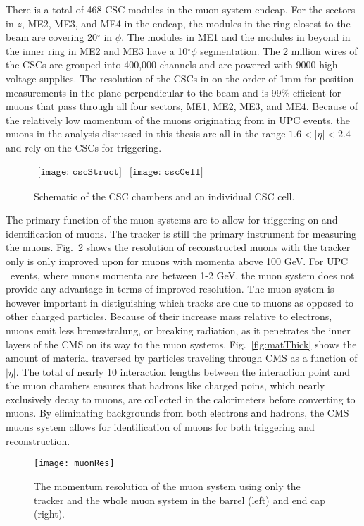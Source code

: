     There is a total of 468 CSC modules in the muon system endcap. 
    For the sectors in $z$, ME2, ME3, and ME4 in the endcap, the modules in 
      the ring closest to the beam are covering 20$^{\circ}$ in $\phi$.
    The modules in ME1 and the modules in beyond in the inner ring in
      ME2 and ME3 have a 10$^{\circ} \phi$ segmentation.
    The 2 million wires of the CSCs are grouped into 400,000 channels and are
      powered with 9000 high voltage supplies. 
    The resolution of the CSCs in on the order of 1mm for position measurements 
      in the plane perpendicular to the beam and is 99\% efficient for muons
      that pass through all four sectors, ME1, ME2, ME3, and ME4.
    Because of the relatively low momentum of the muons originating from \JPsi{}
      in UPC events, the muons in the analysis discussed in this thesis are all
      in the range $1.6 < |\eta| < 2.4$ and rely on the CSCs for triggering. 
    \begin{figure}[!Hhbt]
      \centering
      $ \begin{array}{cc}
        \texttt{[image: cscStruct]} &
        \texttt{[image: cscCell]}
      \end{array} $
      \caption{Schematic of the CSC chambers and an individual CSC cell.}
      \label{fig:cscSchem}
    \end{figure}

    The primary function of the muon systems are to allow for triggering on and
      identification of muons.
    The tracker is still the primary instrument for measuring the muons. 
    Fig.~\ref{fig:muonRes} shows the resolution of reconstructed muons with 
      the tracker only is only improved upon for muons with momenta above 
      100 GeV. 
    For UPC \JPsi{}~events, where muons momenta are between 1-2 GeV, the muon
      system does not provide any advantage in terms of improved resolution.
    The muon system is however important in distiguishing which tracks are 
      due to muons as opposed to other charged particles.
    Because of their increase mass relative to electrons, muons emit less 
      bremsstralung, or breaking radiation, as it penetrates the inner layers
      of the CMS on its way to the muon systems.
    Fig.~\ref{fig:matThick} shows the amount of material traversed by particles
      traveling through CMS as a function of $|\eta|$.
    The total of nearly 10 interaction lengths between the interaction point 
      and the muon chambers ensures that hadrons like charged poins, which
      nearly exclusively decay to muons, are collected in the calorimeters 
      before converting to muons. 
    By eliminating backgrounds from both electrons and hadrons, the CMS muons 
      system allows for identification of muons for both triggering and 
      reconstruction.
    \begin{figure}[!Hhbt]
      \centering
      \texttt{[image: muonRes]}
      \caption{ The momentum resolution of the muon system using only the 
        tracker and the whole muon system in the barrel (left) and end cap 
        (right).}
      \label{fig:muonRes}
    \end{figure}

